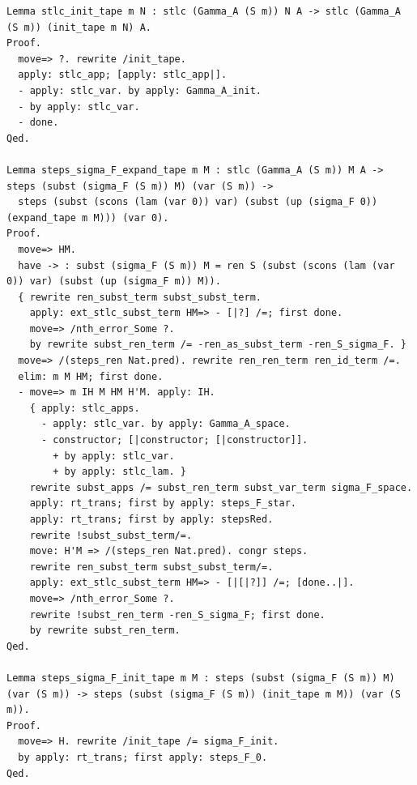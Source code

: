 \documentclass[10pt,a4paper]{amsart}
\begin{document}
\begin{lstlisting}
Lemma stlc_init_tape m N : stlc (Gamma_A (S m)) N A -> stlc (Gamma_A (S m)) (init_tape m N) A.
Proof.
  move=> ?. rewrite /init_tape.
  apply: stlc_app; [apply: stlc_app|].
  - apply: stlc_var. by apply: Gamma_A_init.
  - by apply: stlc_var.
  - done.
Qed.

Lemma steps_sigma_F_expand_tape m M : stlc (Gamma_A (S m)) M A -> steps (subst (sigma_F (S m)) M) (var (S m)) ->
  steps (subst (scons (lam (var 0)) var) (subst (up (sigma_F 0)) (expand_tape m M))) (var 0).
Proof.
  move=> HM.
  have -> : subst (sigma_F (S m)) M = ren S (subst (scons (lam (var 0)) var) (subst (up (sigma_F m)) M)).
  { rewrite ren_subst_term subst_subst_term.
    apply: ext_stlc_subst_term HM=> - [|?] /=; first done.
    move=> /nth_error_Some ?.
    by rewrite subst_ren_term /= -ren_as_subst_term -ren_S_sigma_F. }
  move=> /(steps_ren Nat.pred). rewrite ren_ren_term ren_id_term /=.
  elim: m M HM; first done.
  - move=> m IH M HM H'M. apply: IH.
    { apply: stlc_apps.
      - apply: stlc_var. by apply: Gamma_A_space.
      - constructor; [|constructor; [|constructor]].
        + by apply: stlc_var.
        + by apply: stlc_lam. }
    rewrite subst_apps /= subst_ren_term subst_var_term sigma_F_space.
    apply: rt_trans; first by apply: steps_F_star.
    apply: rt_trans; first by apply: stepsRed.
    rewrite !subst_subst_term/=.
    move: H'M => /(steps_ren Nat.pred). congr steps.
    rewrite ren_subst_term subst_subst_term/=.
    apply: ext_stlc_subst_term HM=> - [|[|?]] /=; [done..|].
    move=> /nth_error_Some ?.
    rewrite !subst_ren_term -ren_S_sigma_F; first done.
    by rewrite subst_ren_term.
Qed.

Lemma steps_sigma_F_init_tape m M : steps (subst (sigma_F (S m)) M) (var (S m)) -> steps (subst (sigma_F (S m)) (init_tape m M)) (var (S m)).
Proof.
  move=> H. rewrite /init_tape /= sigma_F_init.
  by apply: rt_trans; first apply: steps_F_0.
Qed.


\end{lstlisting}
\end{document}
